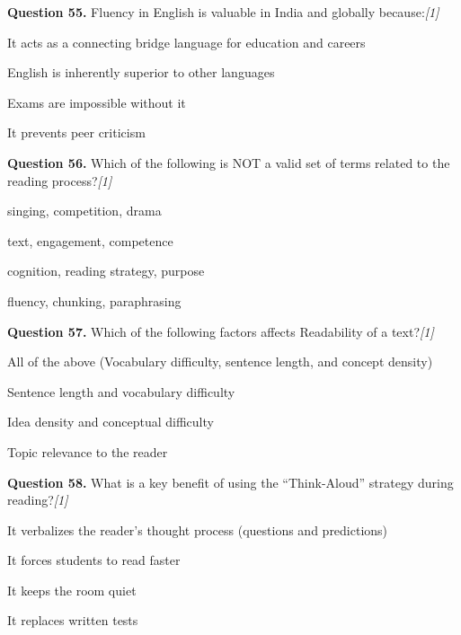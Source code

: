 \documentclass[11pt,a4paper]{article}
\newcommand{\pts}[1]{\hfill   \textit{[#1]}}
\begin{document}
\medskip




\noindent   \textbf{Question 55.} Fluency in English is valuable in India and globally because:\pts{1}

\begin{parts}
  \item It acts as a connecting bridge language for education and careers
  \item English is inherently superior to other languages
  \item Exams are impossible without it
  \item It prevents peer criticism
\end{parts}

\medskip




\noindent   \textbf{Question 56.} Which of the following is NOT a valid set of terms related to the reading process?\pts{1}

\begin{parts}
  \item singing, competition, drama
  \item text, engagement, competence
  \item cognition, reading strategy, purpose
  \item fluency, chunking, paraphrasing
\end{parts}

\medskip




\noindent   \textbf{Question 57.} Which of the following factors affects Readability of a text?\pts{1}

\begin{parts}
  \item All of the above (Vocabulary difficulty, sentence length, and concept density)
  \item Sentence length and vocabulary difficulty
  \item Idea density and conceptual difficulty
  \item Topic relevance to the reader
\end{parts}

\medskip




\noindent   \textbf{Question 58.} What is a key benefit of using the ``Think-Aloud'' strategy during reading?\pts{1}

\begin{parts}
  \item It verbalizes the reader's thought process (questions and predictions)
  \item It forces students to read faster
  \item It keeps the room quiet
  \item It replaces written tests
\end{parts}
\end{document}
